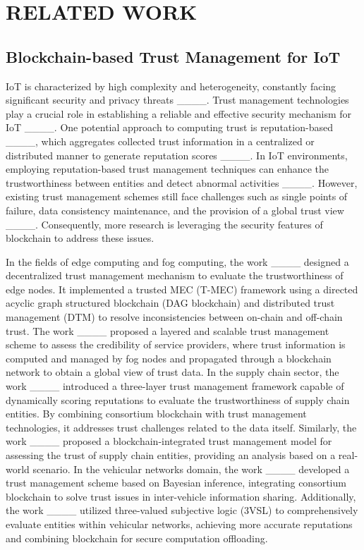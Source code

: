 \section{RELATED WORK}
\subsection{Blockchain-based Trust Management for IoT}
IoT is characterized by high complexity and heterogeneity, constantly facing significant security and privacy threats ____. Trust management technologies play a crucial role in establishing a reliable and effective security mechanism for IoT ____. One potential approach to computing trust is reputation-based ____, which aggregates collected trust information in a centralized or distributed manner to generate reputation scores ____. In IoT environments, employing reputation-based trust management techniques can enhance the trustworthiness between entities and detect abnormal activities ____. However, existing trust management schemes still face challenges such as single points of failure, data consistency maintenance, and the provision of a global trust view ____. Consequently, more research is leveraging the security features of blockchain to address these issues.

In the fields of edge computing and fog computing, the work ____ designed a decentralized trust management mechanism to evaluate the trustworthiness of edge nodes. It implemented a trusted MEC (T-MEC) framework using a directed acyclic graph structured blockchain (DAG blockchain) and distributed trust management (DTM) to resolve inconsistencies between on-chain and off-chain trust. The work ____ proposed a layered and scalable trust management scheme to assess the credibility of service providers, where trust information is computed and managed by fog nodes and propagated through a blockchain network to obtain a global view of trust data. In the supply chain sector, the work ____ introduced a three-layer trust management framework capable of dynamically scoring reputations to evaluate the trustworthiness of supply chain entities. By combining consortium blockchain with trust management technologies, it addresses trust challenges related to the data itself. Similarly, the work ____ proposed a blockchain-integrated trust management model for assessing the trust of supply chain entities, providing an analysis based on a real-world scenario. In the vehicular networks domain, the work ____ developed a trust management scheme based on Bayesian inference, integrating consortium blockchain to solve trust issues in inter-vehicle information sharing. Additionally, the work ____ utilized three-valued subjective logic (3VSL) to comprehensively evaluate entities within vehicular networks, achieving more accurate reputations and combining blockchain for secure computation offloading.


